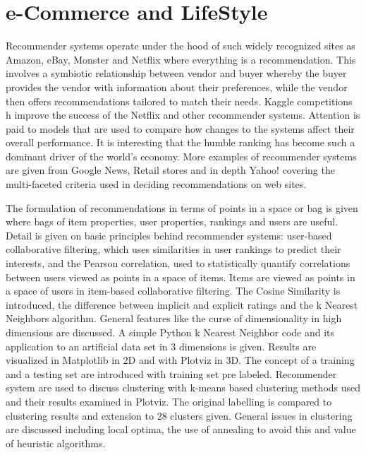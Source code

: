 

\chapter{e-Commerce and LifeStyle}
\label{c:e-commerce}

\FILENAME

Recommender systems operate under the hood of such widely recognized
sites as Amazon, eBay, Monster and Netflix where everything is a
recommendation. This involves a symbiotic relationship between vendor
and buyer whereby the buyer provides the vendor with information about
their preferences, while the vendor then offers recommendations tailored
to match their needs. Kaggle competitions h improve the success of the
Netflix and other recommender systems. Attention is paid to models that
are used to compare how changes to the systems affect their overall
performance. It is interesting that the humble ranking has become such a
dominant driver of the world's economy. More examples of recommender
systems are given from Google News, Retail stores and in depth Yahoo!
covering the multi-faceted criteria used in deciding recommendations on
web sites.

The formulation of recommendations in terms of points in a space or bag
is given where bags of item properties, user properties, rankings and
users are useful. Detail is given on basic principles behind recommender
systems: user-based collaborative filtering, which uses similarities in
user rankings to predict their interests, and the Pearson correlation,
used to statistically quantify correlations between users viewed as
points in a space of items. Items are viewed as points in a space of
users in item-based collaborative filtering. The Cosine Similarity is
introduced, the difference between implicit and explicit ratings and the
k Nearest Neighbors algorithm. General features like the curse of
dimensionality in high dimensions are discussed. A simple Python k
Nearest Neighbor code and its application to an artificial data set in 3
dimensions is given. Results are visualized in Matplotlib in 2D and with
Plotviz in 3D. The concept of a training and a testing set are
introduced with training set pre labeled. Recommender system are used to
discuss clustering with k-means based clustering methods used and their
results examined in Plotviz. The original labelling is compared to
clustering results and extension to 28 clusters given. General issues in
clustering are discussed including local optima, the use of annealing to
avoid this and value of heuristic algorithms.

